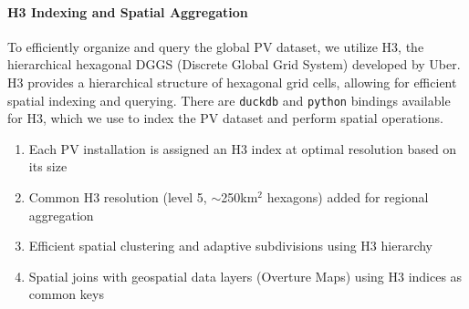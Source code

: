 \begin{multicols}{2}
\paragraph{H3 Indexing and Spatial Aggregation}
To efficiently organize and query the global PV dataset, we utilize H3, the hierarchical hexagonal DGGS (Discrete Global Grid System) developed by Uber.
H3 provides a hierarchical structure of hexagonal grid cells, allowing for efficient spatial indexing and querying. There are \texttt{duckdb} and \texttt{python} bindings available for H3,
which we use to index the PV dataset and perform spatial operations.
\begin{enumerate}
    \item Each PV installation is assigned an H3 index at optimal resolution based on its size
    \item Common H3 resolution (level 5, $\sim$250km$^2$ hexagons) added for regional aggregation
    \item Efficient spatial clustering and adaptive subdivisions using H3 hierarchy
    \item Spatial joins with geospatial data layers (Overture Maps) using H3 indices as common keys
\end{enumerate}




\end{multicols}
